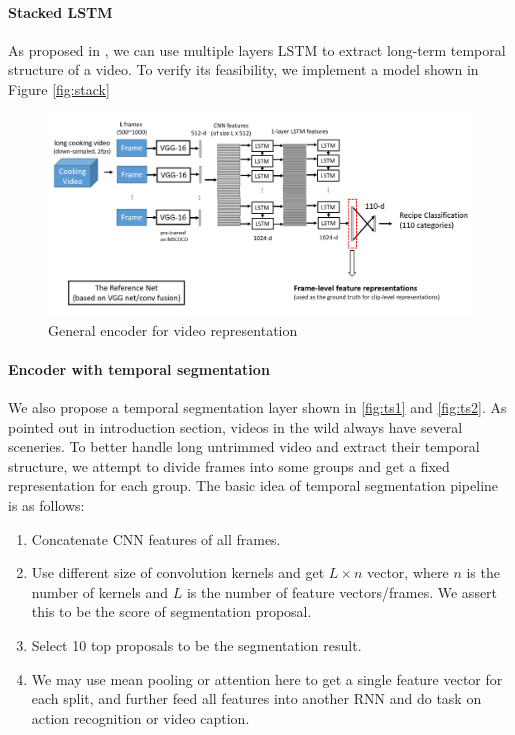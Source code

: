 \paragraph{Stacked LSTM}
As proposed in \cite{pan2015hierarchical}, we can use multiple layers LSTM to extract long-term temporal structure of a video. To verify its feasibility, we implement a model shown in Figure \ref{fig:stack}

\begin{figure}[htbp]
\centering
\includegraphics[width=15cm]{resources/ts1.png}
\caption{General encoder for video representation}
\label{fig:ts1}
\end{figure}

\paragraph{Encoder with temporal segmentation}
We also propose a temporal segmentation layer shown in \autoref{fig:ts1} and \autoref{fig:ts2}. As pointed out in introduction section, videos in the wild always have several sceneries. To better handle long untrimmed video and extract their temporal structure, we attempt to divide frames into some groups and get a fixed representation for each group. The basic idea of temporal segmentation pipeline is as follows:

\begin{enumerate}
\item Concatenate CNN features of all frames.
\item Use different size of convolution kernels and get $L\times n$ vector, where $n$ is the number of kernels and $L$ is the number of feature vectors/frames. We assert this to be the score of segmentation proposal.
\item Select 10 top proposals to be the segmentation result.
\item We may use mean pooling or attention here to get a single feature vector for each split, and further feed all features into another RNN and do task on action recognition or video caption.
\end{enumerate}

